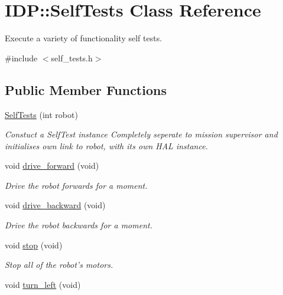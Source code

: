 \hypertarget{classIDP_1_1SelfTests}{
\section{IDP::SelfTests Class Reference}
\label{classIDP_1_1SelfTests}
}


Execute a variety of functionality self tests.  




{\ttfamily \#include $<$self\_\-tests.h$>$}

\subsection*{Public Member Functions}
\begin{DoxyCompactItemize}
\item 
\hyperlink{classIDP_1_1SelfTests_a6864b03502cc5d1ac3728b456b04238f}{SelfTests} (int robot)
\begin{DoxyCompactList}\small\item\em Constuct a SelfTest instance Completely seperate to mission supervisor and initialises own link to robot, with its own HAL instance. \item\end{DoxyCompactList}\item 
void \hyperlink{classIDP_1_1SelfTests_a4ff456e74d55e13599cf64db76bd2ed4}{drive\_\-forward} (void)
\begin{DoxyCompactList}\small\item\em Drive the robot forwards for a moment. \item\end{DoxyCompactList}\item 
void \hyperlink{classIDP_1_1SelfTests_a38ddef7ecdf9b7dfa69d689c9c1ac8ca}{drive\_\-backward} (void)
\begin{DoxyCompactList}\small\item\em Drive the robot backwards for a moment. \item\end{DoxyCompactList}\item 
void \hyperlink{classIDP_1_1SelfTests_a33adf462d8c408b1c7b4858e9a4ff000}{stop} (void)
\begin{DoxyCompactList}\small\item\em Stop all of the robot's motors. \item\end{DoxyCompactList}\item 
void \hyperlink{classIDP_1_1SelfTests_a3ba14e5a1ed52ff112bc742b94f06d61}{turn\_\-left} (void)

\end{DoxyCompactItemize}
